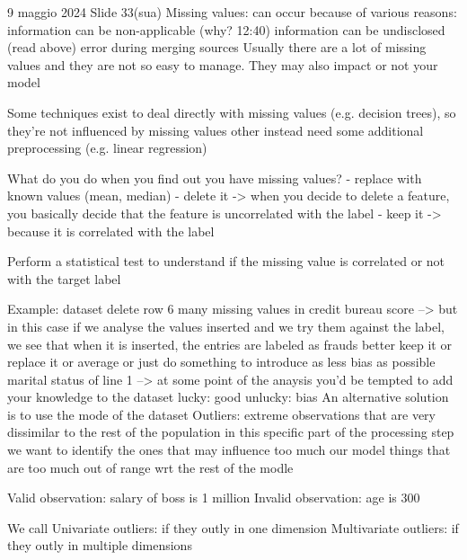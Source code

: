 9 maggio 2024
Slide 33(sua)
Missing values:
    can occur because of various reasons:
        information can be non-applicable (why? 12:40)
        information can be undisclosed (read above)
        error during merging sources
    Usually there are a lot of missing values and they are not so easy to manage.
    They may also impact or not your model

    Some techniques exist to deal directly with missing values (e.g. decision trees), so they're not influenced by missing values
    other instead need some additional preprocessing (e.g. linear regression)

    What do you do when you find out you have missing values?
        - replace with known values (mean, median)
        - delete it -> when you decide to delete a feature, you basically decide that the feature is uncorrelated with the label
        - keep it -> because it is correlated with the label 

        Perform a statistical test to understand if the missing value is correlated or not with the target label

    Example: dataset 
        delete row 6
        many missing values in credit bureau score --> but in this case if we analyse the values inserted and we try them against
                                                        the label, we see that when it is inserted, the entries are labeled as frauds
                                                        better keep it or replace it 
                                                        or average or just do something to introduce as less bias as possible
        marital status of line 1 --> at some point of the anaysis you'd be tempted to add your knowledge to the dataset 
                                    lucky: good 
                                    unlucky: bias 
                                    An alternative solution is to use the mode of the dataset 
    Outliers:
        extreme observations that are very dissimilar to the rest of the population
        in this specific part of the processing step we want to identify the ones that may influence too much our model 
        things that are too much out of range wrt the rest of the modle 

        Valid observation: salary of boss is 1 million
        Invalid observation: age is 300

        We call
            Univariate outliers: if they outly in one dimension 
            Multivariate outliers: if they outly in multiple dimensions 

